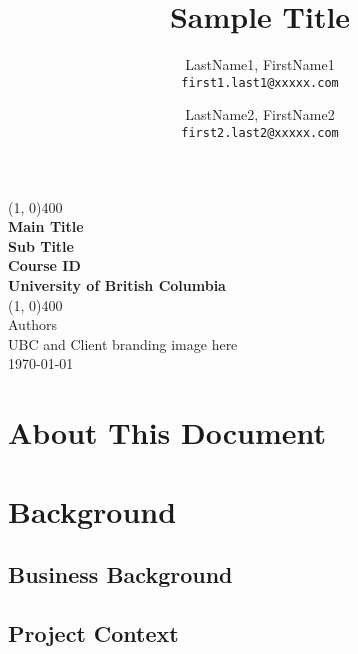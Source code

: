 \documentclass[10pt,letterpaper]{article}
\author{
	LastName1, FirstName1\\
	\texttt{first1.last1@xxxxx.com}
	\and
	LastName2, FirstName2\\
	\texttt{first2.last2@xxxxx.com}
}
\title{Sample Title}
\begin{document}
\begin{titlepage}
	\begin{center}
		\vspace*{3in}
		\line(1, 0){400}\\
		\Huge{\textbf{Main Title}}\\[0.2cm]
		\large{\textbf{Sub Title}}\\[1cm]
		\Large{\textbf{Course ID}}\\
		\textbf{University of British Columbia}\\
		\line(1, 0){400}\\
		\vfill
		\Large{Authors}\\
		UBC and Client branding image here\\

		\today\\
	\end{center}
\end{titlepage}

% 







\thispagestyle{empty}
\listoffigures
\listoftables
\newpage

\setcounter{page}{1}


\section{About This Document}

\section{Background}

\subsection{Business Background}

\subsection{Project Context}
\end{document}
